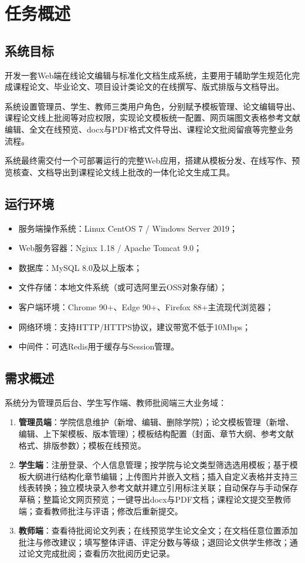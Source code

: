\documentclass{../template/softeng}
\begin{document}
\section{任务概述}

\subsection{系统目标}
开发一套Web端在线论文编辑与标准化文档生成系统，主要用于辅助学生规范化完成课程论文、毕业论文、项目设计类论文的在线撰写、版式排版与文档导出。

系统设置管理员、学生、教师三类用户角色，分别赋予模板管理、论文编辑导出、课程论文线上批阅等对应权限，实现论文模板统一配置、网页端图文表格参考文献编辑、全文在线预览、docx与PDF格式文件导出、课程论文批阅留痕等完整业务流程。

系统最终需交付一个可部署运行的完整Web应用，搭建从模板分发、在线写作、预览核查、文档导出到课程论文线上批改的一体化论文生成工具。

\subsection{运行环境}
\begin{itemize}
	\item 服务端操作系统：Linux CentOS 7 / Windows Server 2019；
	\item Web服务容器：Nginx 1.18 / Apache Tomcat 9.0；
	\item 数据库：MySQL 8.0及以上版本；
	\item 文件存储：本地文件系统（或可选阿里云OSS对象存储）；
	\item 客户端环境：Chrome 90+、Edge 90+、Firefox 88+主流现代浏览器；
	\item 网络环境：支持HTTP/HTTPS协议，建议带宽不低于10Mbps；
	\item 中间件：可选Redis用于缓存与Session管理。
\end{itemize}

\subsection{需求概述}
系统分为管理员后台、学生写作端、教师批阅端三大业务域：

\begin{enumerate}
	\item \textbf{管理员端}：学院信息维护（新增、编辑、删除学院）；论文模板管理（新增、编辑、上下架模板、版本管理）；模板结构配置（封面、章节大纲、参考文献格式、排版参数）；模板在线预览。
	
	\item \textbf{学生端}：注册登录、个人信息管理；按学院与论文类型筛选选用模板；基于模板大纲进行结构化章节编辑；上传图片并嵌入文档；插入自定义表格并支持三线表转换；独立模块录入参考文献并建立引用标注关联；自动保存与手动保存草稿；整篇论文网页预览；一键导出docx与PDF文档；课程论文提交至教师端；查看教师批注与评语；修改后重新提交。
	
	\item \textbf{教师端}：查看待批阅论文列表；在线预览学生论文全文；在文档任意位置添加批注与修改建议；填写整体评语、评定分数与等级；退回论文供学生修改；通过论文完成批阅；查看历次批阅历史记录。
\end{enumerate}
\end{document}
